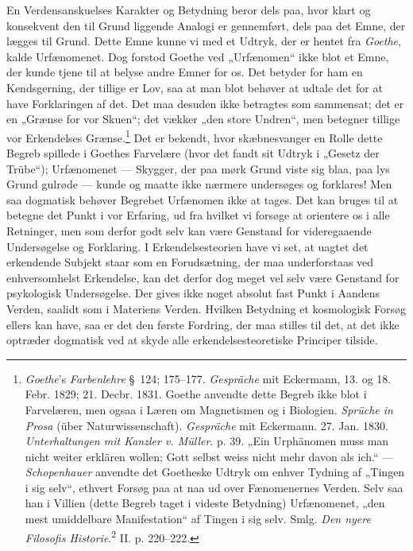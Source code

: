 \documentclass[12pt,a4paper]{book}
\newcommand{\opage}[1]{\marginnote{\footnotesize\textit{[#1]}}}
\begin{document}
En Verdensanskuelses Karakter og Betydning beror dels paa, hvor klart og konsekvent den
til Grund liggende Analogi er gennemført, dels paa det Emne, der lægges til Grund. Dette
Emne kunne vi med et Udtryk, der er hentet fra \emph{Goethe}, kalde Urfænomenet. Dog
forstod Goethe ved „Urfænomen“ ikke blot et Emne, der kunde tjene til at belyse andre
Emner for os. Det betyder for ham en Kendsgerning, der tillige er Lov, saa at man blot
behøver at udtale det for at have Forklaringen af det. Det maa desuden ikke be\opage{312}tragtes som sammensat; det er en „Grænse for vor Skuen“; det vækker „den store Undren“, men
betegner tillige vor Erkendelses Grænse.\footnote{\emph{Goethe}'s \emph{Farbenlehre}
\S\ 124; 175--177. \emph{Gespräche} mit Eckermann, 13. og 18. Febr. 1829; 21. Decbr.
1831. Goethe anvendte dette Begreb ikke blot i Farvelæren, men ogsaa i Læren om
Magnetismen og i Biologien. \emph{Sprüche in Prosa} (über Naturwissenschaft).
\emph{Gespräche} mit Eckermann. 27. Jan. 1830. \emph{Unterhaltungen mit Kanzler v.
Müller}. p. 39. „Ein Urphänomen muss man nicht weiter erklären wollen; Gott selbst weiss
nicht mehr davon als ich.“ --- \emph{Schopenhauer} anvendte det Goetheske Udtryk om
enhver Tydning af „Tingen i sig selv“, ethvert Forsøg paa at naa ud over Fænomenernes
Verden. Selv saa han i Villien (dette Begreb taget i videste Betydning) Urfænomenet,
„den mest umiddelbare Manifestation“ af Tingen i sig selv. Smlg. \emph{Den nyere
Filosofis Historie}.\textsuperscript{2} II. p. 220--222.} Det er bekendt, hvor
skæbnesvanger en Rolle dette Begreb spillede i Goethes Farvelære (hvor det fandt sit
Udtryk i „Gesetz der Trübe“); Urfænomenet --- Skygger, der paa mørk Grund viste sig
blaa, paa lys Grund gulrøde --- kunde og maatte ikke nærmere undersøges og forklares!
Men saa dogmatisk behøver Begrebet Urfænomen ikke at tages. Det kan bruges til at
betegne det Punkt i vor Erfaring, ud fra hvilket vi forsøge at orientere os i alle
Retninger, men som derfor godt selv kan være Genstand for videregaaende Undersøgelse og
Forklaring. I Erkendelsesteorien have vi set, at uagtet det erkendende Subjekt staar som
en Forudsætning, der maa underforstaas ved enhversomhelst Erkendelse, kan det derfor dog
meget vel selv være Genstand for psykologisk Undersøgelse. Der gives ikke noget absolut
fast Punkt i Aandens Verden, saalidt som i Materiens Verden. Hvilken Betydning et
kosmologisk Forsøg ellers kan have, saa er det den første Fordring, der maa stilles til
det, at det ikke optræder dogmatisk ved at skyde alle erkendelsesteoretiske Principer
tilside.
\end{document}
